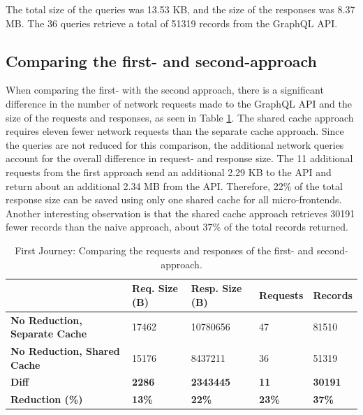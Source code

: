 \noindent The total size of the queries was 13.53 KB, and the size of the responses was 8.37 MB. The 36 queries retrieve a total of 51319 records from the GraphQL \ac{API}.

\subsection{Comparing the first- and second-approach}\label{subsection:results:comparison-first-second-approach}

When comparing the first- with the second approach, there is a significant difference in the number of network requests made to the GraphQL \ac{API} and the size of the requests and responses, as seen in Table \ref{table:results:size-comparison-first-path-no-cache-no-reduction-cache-no-reduction}. The shared cache approach requires eleven fewer network requests than the separate cache approach. Since the queries are not reduced for this comparison, the additional network queries account for the overall difference in request- and response size. The 11 additional requests from the first approach send an additional 2.29 KB to the \ac{API} and return about an additional 2.34 MB from the \ac{API}. Therefore, 22\% of the total response size can be saved using only one shared cache for all micro-frontends. Another interesting observation is that the shared cache approach retrieves 30191 fewer records than the naive approach, about 37\% of the total records returned.

\ifshowTables
\begin{table}[H]
  \begin{tabular}{|l|l|l|l|l|}
  \hline
    & \textbf{Req. Size (B)} & \textbf{Resp. Size (B)} & \textbf{Requests} & \textbf{Records} \\
    \hline
    \textbf{No Reduction, Separate Cache} & 17462 & 10780656 & 47 & 81510 \\
    \hline
    \textbf{No Reduction, Shared Cache} & 15176 & 8437211 & 36 & 51319 \\
    \hline
    \hline
    \textbf{Diff} & \textbf{2286} & \textbf{2343445} & \textbf{11} & \textbf{30191} \\
    \hline
    \textbf{Reduction (\%)} & \textbf{13\%} & \textbf{22\%} & \textbf{23\%} & \textbf{37\%} \\
    \hline
  \end{tabular}
  \caption{First Journey: Comparing the requests and responses of the first- and second-approach.}\label{table:results:size-comparison-first-path-no-cache-no-reduction-cache-no-reduction}
\end{table}
\fi

